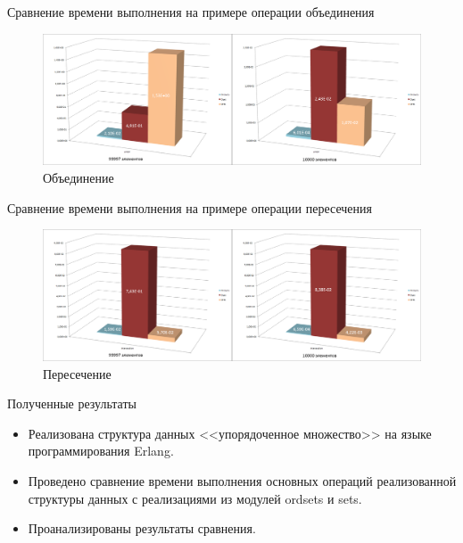 \documentclass{beamer}
\begin{document}
	
	\begin{frame}{Сравнение времени выполнения на примере операции объединения}
		\begin{figure}
			\includegraphics[scale=0.18]{img/histograms/union.png}
			\caption{Объединение}
		\end{figure}
	\end{frame}
	
	\begin{frame}{Сравнение времени выполнения на примере операции пересечения}
		\begin{figure}
			\includegraphics[scale=0.18]{img/histograms/intersection.png}
			\caption{Пересечение}
		\end{figure}		
	\end{frame}
	
	\begin{frame}{Полученные результаты}
		\begin{itemize}
			\item Реализована структура данных <<упорядоченное множество>> на языке программирования Erlang.
			\item Проведено сравнение времени выполнения основных операций реализованной структуры данных с 
			      реализациями из модулей ordsets и sets. 
			\item Проанализированы результаты сравнения.
		\end{itemize}
	\end{frame}
\end{document}
